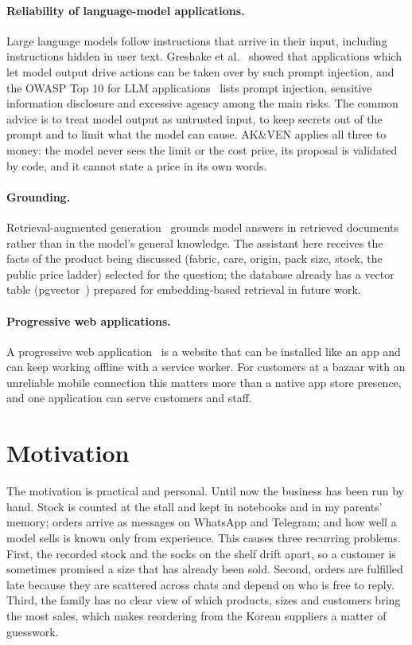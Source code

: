\paragraph{Reliability of language-model applications.} Large language models follow instructions that arrive in their
input, including instructions hidden in user text. Greshake et al.~\cite{greshake2023} showed that applications which
let model output drive actions can be taken over by such prompt injection, and the OWASP Top 10 for LLM
applications~\cite{owaspllm} lists prompt injection, sensitive information disclosure and excessive agency among the
main risks. The common advice is to treat model output as untrusted input, to keep secrets out of the prompt and to
limit what the model can cause. AK\&VEN applies all three to money: the model never sees the limit or the cost price,
its proposal is validated by code, and it cannot state a price in its own words.

\paragraph{Grounding.} Retrieval-augmented generation~\cite{lewis2020rag} grounds model answers in retrieved documents
rather than in the model's general knowledge. The assistant here receives the facts of the product being discussed
(fabric, care, origin, pack size, stock, the public price ladder) selected for the question; the database already has a
vector table (pgvector~\cite{pgvector}) prepared for embedding-based retrieval in future work.

\paragraph{Progressive web applications.} A progressive web application~\cite{pwa} is a website that can be installed
like an app and can keep working offline with a service worker. For customers at a bazaar with an unreliable mobile
connection this matters more than a native app store presence, and one application can serve customers and staff.

\section{Motivation}
\label{sec:motivation}

The motivation is practical and personal. Until now the business has been run by hand. Stock is counted at the stall
and kept in notebooks and in my parents' memory; orders arrive as messages on WhatsApp and Telegram; and how well a
model sells is known only from experience. This causes three recurring problems. First, the recorded stock and the
socks on the shelf drift apart, so a customer is sometimes promised a size that has already been sold. Second, orders
are fulfilled late because they are scattered across chats and depend on who is free to reply. Third, the family has
no clear view of which products, sizes and customers bring the most sales, which makes reordering from the Korean
suppliers a matter of guesswork.


